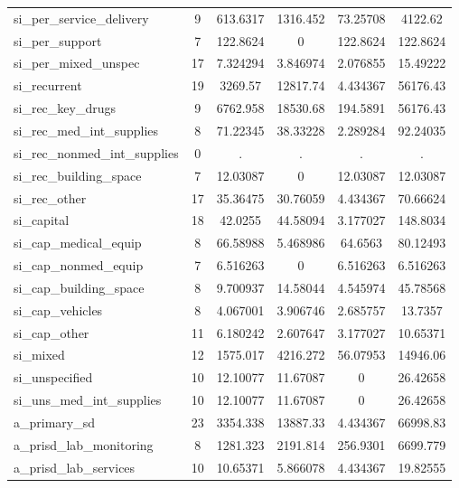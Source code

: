 \begin{table}[htbp]
\begin{tabular}{l*{1}{ccccc}}
si\_per\_service\_delivery&           9&    613.6317&    1316.452&    73.25708&     4122.62\\
si\_per\_support&           7&    122.8624&           0&    122.8624&    122.8624\\
si\_per\_mixed\_unspec&          17&    7.324294&    3.846974&    2.076855&    15.49222\\
si\_recurrent&          19&     3269.57&    12817.74&    4.434367&    56176.43\\
si\_rec\_key\_drugs&           9&    6762.958&    18530.68&    194.5891&    56176.43\\
si\_rec\_med\_int\_supplies&           8&    71.22345&    38.33228&    2.289284&    92.24035\\
si\_rec\_nonmed\_int\_supplies&           0&           .&           .&           .&           .\\
si\_rec\_building\_space&           7&    12.03087&           0&    12.03087&    12.03087\\
si\_rec\_other&          17&    35.36475&    30.76059&    4.434367&    70.66624\\
si\_capital  &          18&     42.0255&    44.58094&    3.177027&    148.8034\\
si\_cap\_medical\_equip&           8&    66.58988&    5.468986&     64.6563&    80.12493\\
si\_cap\_nonmed\_equip&           7&    6.516263&           0&    6.516263&    6.516263\\
si\_cap\_building\_space&           8&    9.700937&    14.58044&    4.545974&    45.78568\\
si\_cap\_vehicles&           8&    4.067001&    3.906746&    2.685757&     13.7357\\
si\_cap\_other&          11&    6.180242&    2.607647&    3.177027&    10.65371\\
si\_mixed    &          12&    1575.017&    4216.272&    56.07953&    14946.06\\
si\_unspecified&          10&    12.10077&    11.67087&           0&    26.42658\\
si\_uns\_med\_int\_supplies&          10&    12.10077&    11.67087&           0&    26.42658\\
a\_primary\_sd&          23&    3354.338&    13887.33&    4.434367&    66998.83\\
a\_prisd\_lab\_monitoring&           8&    1281.323&    2191.814&    256.9301&    6699.779\\
a\_prisd\_lab\_services&          10&    10.65371&    5.866078&    4.434367&    19.82555\\

\end{tabular}
\end{table}
